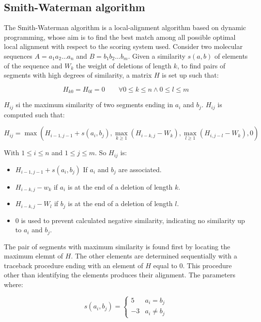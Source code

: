     \subsection{Smith-Waterman algorithm}
    The Smith-Waterman algorithm is a local-alignment algorithm based on dynamic programming, whose aim is to find the best match among all possible optimal local alignment with respect to the scoring system used.
    Consider two molecular sequences $A = a_1a_2\dots a_n$ and $B = b_1b_2\dots b_m$.
    Given a similarity $s(a,b)$ of elements of the sequence and $W_k$ the weight of deletions of length $k$, to find pairs of segments with high degrees of similarity, a matrix $H$ is set up such that:

    $$H_{k0} = H_{0l} = 0\qquad \forall 0\le k\le n\land 0\le l\le m$$

    $H_{ij}$ si the maximum similarity of two segments ending in $a_i$ and $b_j$.
    $H_{ij}$ is computed such that:

    $$H_{ij} = \max(H_{i-1, j-1} + s(a_i, b_j), \max\limits_{k\ge 1}(H_{i-k, j}-W_k), \max\limits_{l\ge 1}(H_{i, j-l}-W_k), 0)$$

    With $1\le i\le n$ and $1\le j\le m$.
    So $H_{ij}$ is:

    \begin{multicols}{2}
      \begin{itemize}
        \item $H_{i-1, j-1} + s(a_i, b_j)$ If $a_i$ and $b_j$ are associated.
        \item $H_{i-k, j}-w_k$ if $a_i$ is at the end of a deletion of length $k$.
        \item $H_{i-k, j}-W_l$ if $b_j$ is at the end of a deletion of length $l$.
        \item $0$ is used to prevent calculated negative similarity, indicating no similarity up to $a_i$ and $b_j$.
      \end{itemize}
    \end{multicols}

    The pair of segments with maximum similarity is found first by locating the maximum elemnt of $H$.
    The other elements are determined sequentially with a traceback procedure ending with an element of $H$ equal to $0$.
    This procedure other than identifying the elements produces their alignment.
    The parameters  where:

    $$s(a_i, b_j) = \begin{cases} 5 & a_i = b_j \\ -3 & a_i\neq b_j\end{cases}$$

